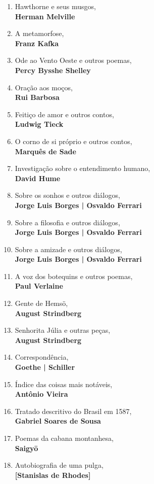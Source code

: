 \begin{enumerate} [font=\Formular\scriptsize]
\item Hawthorne e seus musgos,\\ \textbf{Herman Melville}
\item A metamorfose,\\ \textbf{Franz Kafka}
\item Ode ao Vento Oeste e outros poemas,\\ \textbf{Percy Bysshe Shelley}
\item Oração aos moços,\\ \textbf{Rui Barbosa}
\item Feitiço de amor e outros contos,\\ \textbf{Ludwig Tieck}
\item O corno de si próprio e outros contos,\\ \textbf{Marquês de Sade}
\item Investigação sobre o entendimento humano,\\ \textbf{David Hume}
\item Sobre os sonhos e outros diálogos,\\ \textbf{Jorge Luis Borges | Osvaldo Ferrari}
\item Sobre a filosofia e outros diálogos,\\ \textbf{Jorge Luis Borges | Osvaldo Ferrari}
\item Sobre a amizade e outros diálogos,\\ \textbf{Jorge Luis Borges | Osvaldo Ferrari}
\item A voz dos botequins e outros poemas,\\ \textbf{Paul Verlaine}
\item Gente de Hemsö,\\ \textbf{August Strindberg}
\item Senhorita Júlia e outras peças,\\ \textbf{August Strindberg}
\item Correspondência,\\ \textbf{Goethe | Schiller}
\item Índice das coisas mais notáveis,\\ \textbf{Antônio Vieira}
\item Tratado descritivo do Brasil em 1587,\\ \textbf{Gabriel Soares de Sousa}
\item Poemas da cabana montanhesa,\\ \textbf{Saigy\=o}
\item Autobiografia de uma pulga,\\ \textbf{{[}Stanislas de Rhodes{]}}

\end{enumerate}
